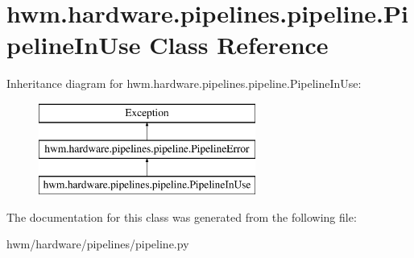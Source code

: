 \hypertarget{classhwm_1_1hardware_1_1pipelines_1_1pipeline_1_1_pipeline_in_use}{\section{hwm.\-hardware.\-pipelines.\-pipeline.\-Pipeline\-In\-Use Class Reference}
\label{classhwm_1_1hardware_1_1pipelines_1_1pipeline_1_1_pipeline_in_use}
}
Inheritance diagram for hwm.\-hardware.\-pipelines.\-pipeline.\-Pipeline\-In\-Use\-:\begin{figure}[H]
\begin{center}
\leavevmode
\includegraphics[height=3.000000cm]{classhwm_1_1hardware_1_1pipelines_1_1pipeline_1_1_pipeline_in_use}
\end{center}
\end{figure}


The documentation for this class was generated from the following file\-:\begin{DoxyCompactItemize}
\item 
hwm/hardware/pipelines/pipeline.\-py\end{DoxyCompactItemize}
